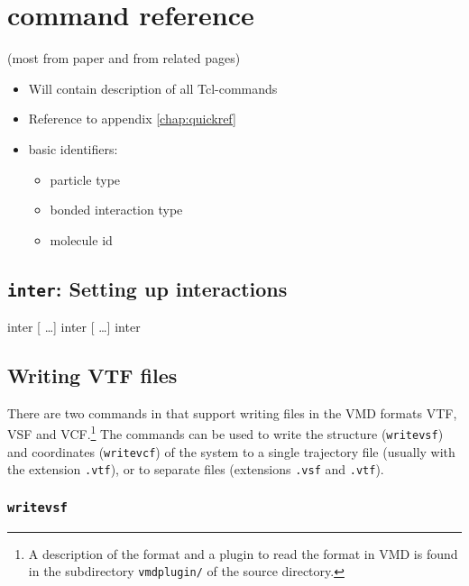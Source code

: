 \chapter{\es{} command reference}
\label{chap:ref}

(most from paper and from related pages)

\begin{itemize}
\item Will contain description of all Tcl-commands
\item Reference to appendix \vref{chap:quickref}
\item basic identifiers:
  \begin{itemize}
  \item particle type
  \item bonded interaction type
  \item molecule id
  \end{itemize}
\end{itemize}


\section{\texttt{inter}: Setting up interactions}
\label{sec:inter}
\begin{command}
  {inter
    [ \ldots ]
  }
  {inter
      [
    \ldots ]
  }
  {inter}
\end{command}

\section{Writing VTF files}
There are two commands in \es{} that support writing files in the VMD
formats VTF, VSF and VCF.\footnote{A description of the format and a
  plugin to read the format in VMD is found in the subdirectory
  \texttt{vmdplugin/} of the \es{} source directory.} The commands can
be used to write the structure (\texttt{writevsf}) and coordinates
(\texttt{writevcf}) of the system to a single trajectory file (usually
with the extension \texttt{.vtf}), or to separate files (extensions
\texttt{.vsf} and \texttt{.vtf}).

\subsection{\texttt{writevsf}}

